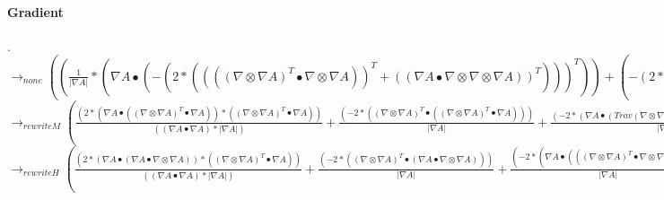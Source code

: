 \documentclass{article}
\begin{document}
 \paragraph{Gradient}
 . \\ \newline $\rightarrow_{none}
 (( \frac{1}{| \nabla A|}*( \nabla A \bullet (-{(2*(((( \nabla  \otimes  \nabla A)^T \bullet  \nabla  \otimes  \nabla A))^T+(( \nabla A \bullet  \nabla  \otimes  \nabla  \otimes  \nabla A))^T))})^T))+(-{(2*( \nabla A \bullet  \nabla  \otimes  \nabla A))} \bullet (((( \frac{1}{| \nabla A|}* \nabla  \otimes  \nabla A))^T+((( \nabla A* \frac{(-1*( \nabla A \bullet  \nabla  \otimes  \nabla A))}{(( \nabla A \bullet  \nabla A)*| \nabla A|)})))^T))^T))$
 \\ \newline $\rightarrow_{rewriteM}( \frac{(2*( \nabla A \bullet (( \nabla  \otimes  \nabla A)^T \bullet  \nabla A))*(( \nabla  \otimes  \nabla A)^T \bullet  \nabla A))}{(( \nabla A \bullet  \nabla A)*| \nabla A|)}+ \frac{(-2*(( \nabla  \otimes  \nabla A)^T \bullet (( \nabla  \otimes  \nabla A)^T \bullet  \nabla A)))}{| \nabla A|}+ \frac{(-2*( \nabla A \bullet (Trav( \nabla  \otimes  \nabla  \otimes  \nabla A)<2,1,0> \bullet  \nabla A)))}{| \nabla A|}+ \frac{(-2*( \nabla A \bullet ((( \nabla  \otimes  \nabla A)^T \bullet  \nabla  \otimes  \nabla A))^T))}{| \nabla A|})$
 \\ \newline $\rightarrow_{rewriteH}( \frac{(2*( \nabla A \bullet ( \nabla A \bullet  \nabla  \otimes  \nabla A))*(( \nabla  \otimes  \nabla A)^T \bullet  \nabla A))}{(( \nabla A \bullet  \nabla A)*| \nabla A|)}+ \frac{(-2*(( \nabla  \otimes  \nabla A)^T \bullet ( \nabla A \bullet  \nabla  \otimes  \nabla A)))}{| \nabla A|}+ \frac{(-2*( \nabla A \bullet ((( \nabla  \otimes  \nabla A)^T \bullet  \nabla  \otimes  \nabla A))^T))}{| \nabla A|}+ \frac{(-2*( \nabla A \bullet (Trav( \nabla  \otimes  \nabla  \otimes  \nabla A)<2,1,0> \bullet  \nabla A)))}{| \nabla A|})$
  
\end{document}
